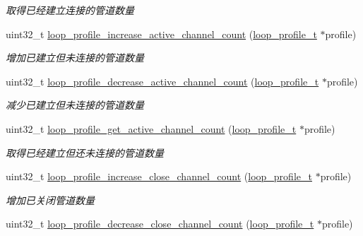 \begin{DoxyCompactItemize}
\begin{DoxyCompactList}\small\item\em 取得已经建立连接的管道数量 \end{DoxyCompactList}\item 
uint32\+\_\+t \hyperlink{a00077_a60b6b1d29dcb8746bc44c90b8b438544_a60b6b1d29dcb8746bc44c90b8b438544}{loop\+\_\+profile\+\_\+increase\+\_\+active\+\_\+channel\+\_\+count} (\hyperlink{a00050_ad060e1396346d2f5db1ec0597376a107_ad060e1396346d2f5db1ec0597376a107}{loop\+\_\+profile\+\_\+t} $\ast$profile)
\begin{DoxyCompactList}\small\item\em 增加已建立但未连接的管道数量 \end{DoxyCompactList}\item 
uint32\+\_\+t \hyperlink{a00077_ab1bcbe8b5c4c4618605821581cdcaacd_ab1bcbe8b5c4c4618605821581cdcaacd}{loop\+\_\+profile\+\_\+decrease\+\_\+active\+\_\+channel\+\_\+count} (\hyperlink{a00050_ad060e1396346d2f5db1ec0597376a107_ad060e1396346d2f5db1ec0597376a107}{loop\+\_\+profile\+\_\+t} $\ast$profile)
\begin{DoxyCompactList}\small\item\em 减少已建立但未连接的管道数量 \end{DoxyCompactList}\item 
uint32\+\_\+t \hyperlink{a00077_a25e7659843c550c5d2147286ad1b48ae_a25e7659843c550c5d2147286ad1b48ae}{loop\+\_\+profile\+\_\+get\+\_\+active\+\_\+channel\+\_\+count} (\hyperlink{a00050_ad060e1396346d2f5db1ec0597376a107_ad060e1396346d2f5db1ec0597376a107}{loop\+\_\+profile\+\_\+t} $\ast$profile)
\begin{DoxyCompactList}\small\item\em 取得已经建立但还未连接的管道数量 \end{DoxyCompactList}\item 
uint32\+\_\+t \hyperlink{a00077_ae06a8af9d1d8e3b32a3ae6220aa904b2_ae06a8af9d1d8e3b32a3ae6220aa904b2}{loop\+\_\+profile\+\_\+increase\+\_\+close\+\_\+channel\+\_\+count} (\hyperlink{a00050_ad060e1396346d2f5db1ec0597376a107_ad060e1396346d2f5db1ec0597376a107}{loop\+\_\+profile\+\_\+t} $\ast$profile)
\begin{DoxyCompactList}\small\item\em 增加已关闭管道数量 \end{DoxyCompactList}\item 
uint32\+\_\+t \hyperlink{a00077_abae75de750f7969632e5e8087eb6c778_abae75de750f7969632e5e8087eb6c778}{loop\+\_\+profile\+\_\+decrease\+\_\+close\+\_\+channel\+\_\+count} (\hyperlink{a00050_ad060e1396346d2f5db1ec0597376a107_ad060e1396346d2f5db1ec0597376a107}{loop\+\_\+profile\+\_\+t} $\ast$profile)

\end{DoxyCompactItemize}
